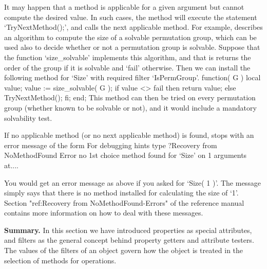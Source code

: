 It may happen that a method is applicable for a given argument
but cannot compute the desired value.
In such cases, the method will execute the statement `TryNextMethod();',
%
and {\GAP} calls the next applicable method.
For example, \cite{Sims90b} describes an algorithm to compute the size
of a solvable permutation group, which can be used also to decide
whether or not a permutation group is solvable.
Suppose that the function `size_solvable' implements this algorithm,
and that is returns the order of the group if it is solvable and
`fail' otherwise.
Then we can install the following method for `Size' with required
filter `IsPermGroup'.
\begintt
function( G )
local  value;
    value := size_solvable( G );
    if value <> fail  then  return value;
                      else  TryNextMethod();  fi;
end;
\endtt
This method can then be tried on every permutation group (whether known
to be  solvable or  not),  and it would  include a  mandatory solvability
test.

If no applicable method  (or no next applicable  method) is found, {\GAP}
stops with an error message of the form 
\begintt
For debugging hints type ?Recovery from NoMethodFound
Error no 1st choice method found for `Size' on 1 arguments at....
\endtt

You would get an error message as above if you asked for `Size( 1 )'. 
The message simply says that there is no method installed for calculating
the size of `1'. Section "ref:Recovery from NoMethodFound-Errors" of
the reference manual contains more information on how to deal with 
these messages.

{\bf Summary.} In this section we have introduced properties as special
attributes, and filters as the general concept behind property getters
and attribute testers.
The values of the filters of an object govern how the object is treated
in the selection of methods for operations.

\null

